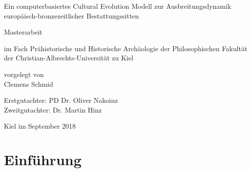 \documentclass[openany,twoside,twocolumn]{book}
\title{}
\author{}
\date{}
\begin{document}
\begin{titlepage}

  \vspace*{\fill}

    \begin{center}

        \Huge Ein computerbasiertes Cultural Evolution Modell zur Ausbreitungsdynamik europäisch-bronzezeitlicher Bestattungssitten

        \vspace{2cm}

        \huge Masterarbeit

        \large im Fach Prähistorische und Historische Archäologie der Philosophischen Fakultät der Christian-Albrechts-Universität zu Kiel

        \vspace{2cm}

        \large vorgelegt von \\
        \huge Clemens Schmid

    \end{center}

\vspace{4cm}

\large Erstgutachter: PD Dr. Oliver Nakoinz \\
\large Zweitgutachter: Dr. Martin Hinz

\vspace{1cm}

\large Kiel im September 2018

  \vspace*{\fill}

\end{titlepage}

\renewcommand{\chaptermark}[1]{\markboth{#1}{}}
\renewcommand{\sectionmark}[1]{\markright{\thesection\ #1}}
\fancyhf{}
\fancyhead[LE,RO]{\textbf{\thepage}}
\fancyhead[LO]{\textbf{\nouppercase{\rightmark}}}
\fancyhead[RE]{\textbf{\nouppercase{\leftmark}}}

\setcounter{tocdepth}{3}
\tableofcontents

\parskip 4pt \setlength{\textfloatsep}{10pt plus 1.0pt minus 2.0pt}

\AtEndDocument{
  
}

\nonfrenchspacing

\hypertarget{intro}{%
\chapter{Einführung}\label{intro}}
\end{document}
